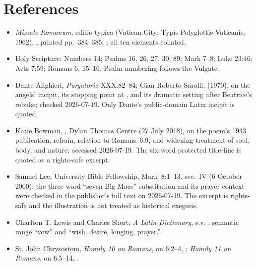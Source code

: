 \section*{References}
{\footnotesize
\begin{itemize}[itemsep=0em,topsep=0.15em,parsep=0pt]
\item \emph{Missale Romanum}, editio typica (Vatican City: Typis Polyglottis Vaticanis, 1962), , printed pp.~384--385, ; all ten elements collated.
\item Holy Scripture: Numbers 14; Psalms 16, 26, 27, 30, 89; Mark 7--8; Luke 23:46; Acts 7:59; Romans 6, 15--16. Psalm numbering follows the Vulgate.
\item Dante Alighieri, \emph{Purgatorio} XXX.82--84; Gian Roberto Sarolli,  (1970), on the angels' incipit, its stopping point at , and its dramatic setting after Beatrice's rebuke; checked 2026-07-19. Only Dante's public-domain Latin incipit is quoted.
\item Katie Bowman, , Dylan Thomas Centre (27 July 2018), on the poem's 1933 publication, refrain, relation to Romans~6:9, and widening treatment of soul, body, and nature; accessed 2026-07-19. The six-word protected title-line is quoted as a rights-safe excerpt.
\item Samuel Lee,  University Bible Fellowship, Mark~8:1--13, sec.~IV (6 October 2000); the three-word ``seven Big Macs'' substitution and its prayer context were checked in the publisher's full text on 2026-07-19. The excerpt is rights-safe and the illustration is not treated as historical exegesis.
\item Charlton T. Lewis and Charles Short, \emph{A Latin Dictionary}, s.v. , semantic range ``vow'' and ``wish, desire, longing, prayer.''
\item St. John Chrysostom, \emph{Homily 10 on Romans}, on 6:2--4, ; \emph{Homily 11 on Romans}, on 6:5--14, .

\end{itemize}}
